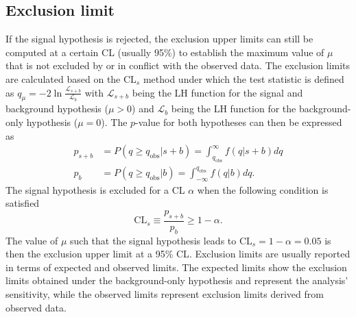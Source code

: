 \documentclass[../thesis.tex]{subfiles}
\begin{document}
\subsection{Exclusion limit}
If the signal hypothesis is rejected, the exclusion upper limits can still be computed at a certain \acs{CL} (usually 95\%) to establish the maximum value of $\mu$ that is not excluded by or in conflict with the observed data. The exclusion limits are calculated based on the $\text{CL}_s$ method \citep{cls1,cls2} under which the test statistic is defined as $q_\mu = -2 \ln \frac{\mathcal{L}_{s+b}}{\mathcal{L}_b}$ with $\mathcal{L}_{s+b}$ being the \acs{LH} function for the signal and background hypothesis ($\mu>0$) and $\mathcal{L}_b$ being the \acs{LH} function for the background-only hypothesis ($\mu=0$). The $p$-value for both hypotheses can then be expressed as
\begin{equation}
\begin{aligned}
p_{s+b} &= P(q\geq q_\text{obs}|s+b)
= \int^\infty_{q_\text{obs}} f(q|s+b)dq \\
p_b 	&= P(q\geq q_\text{obs}|b)
= \int^{q_\text{obs}}_{-\infty} f(q|b)dq.
\end{aligned}
\end{equation}
The signal hypothesis is excluded for a \acs{CL} $\alpha$ when the following condition is satisfied
\begin{equation}
\text{CL}_s \equiv \frac{p_{s+b}}{p_b} \geq 1-\alpha.
\end{equation}
The value of $\mu$ such that the signal hypothesis leads to $\text{CL}_s = 1-\alpha = 0.05$ is then the exclusion upper limit at a 95\% \acs{CL}. Exclusion limits are usually reported in terms of expected and observed limits. The expected limits show the exclusion limits obtained under the background-only hypothesis and represent the analysis' sensitivity, while the observed limits represent exclusion limits derived from observed data.
\end{document}

